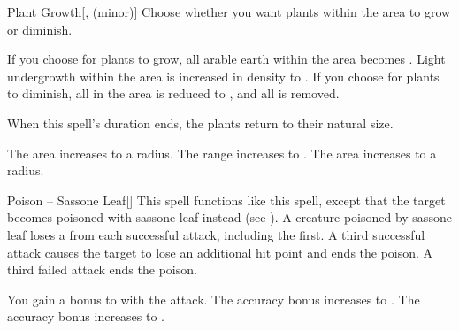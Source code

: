 \lowercase{\hypertarget{spell:Plant Growth}{}}\label{spell:Plant Growth}
\begin{freeability}[Rank 2]{\hypertarget{spell:Plant Growth}{Plant Growth}}[,  (minor)]
Choose whether you want plants within the area to grow or diminish.

If you choose for plants to grow, all arable earth within the area becomes .
Light undergrowth within the area is increased in density to .
If you choose for plants to diminish, all  in the area is reduced to , and all  is removed.

When this spell's duration ends, the plants return to their natural size.

\rankline
{} The area increases to a \arealarge radius.
 The range increases to \rnglong.
 The area increases to a \areahuge radius.
\end{freeability}
\vspace{0.25em}



\lowercase{\hypertarget{spell:Poison -- Sassone Leaf}{}}\label{spell:Poison -- Sassone Leaf}
\begin{freeability}[Rank 2]{\hypertarget{spell:Poison -- Sassone Leaf}{Poison -- Sassone Leaf}}[]
This spell functions like this  spell, except that the target becomes poisoned with sassone leaf instead (see ).
A creature poisoned by sassone leaf loses a  from each successful attack, including the first.
A third successful attack causes the target to lose an additional hit point and ends the poison.
A third failed attack ends the poison.

\rankline
{} You gain a  bonus to  with the attack.
 The accuracy bonus increases to .
 The accuracy bonus increases to .
\end{freeability}
\vspace{0.25em}




